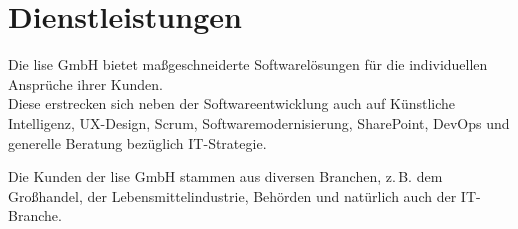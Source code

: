 \section{Dienstleistungen}\label{sec:dienstleistungen}
Die lise GmbH bietet maßgeschneiderte Softwarelösungen für die individuellen Ansprüche ihrer Kunden.\\  
Diese erstrecken sich neben der Softwareentwicklung auch auf Künstliche Intelligenz, UX-Design, Scrum,  
Softwaremodernisierung, SharePoint, DevOps und generelle Beratung bezüglich IT-Strategie.\autocite[/ueber-uns/unternehmen]{LiseWeb}  

Die Kunden der lise GmbH stammen aus diversen Branchen, z.\,B. dem Großhandel, der Lebensmittelindustrie, Behörden und natürlich auch der IT-Branche.






